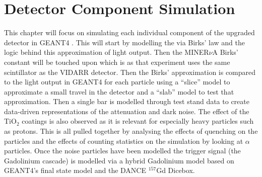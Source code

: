 

\chapter{Detector Component Simulation}\label{chp:GEANT4Simulation}
\ifpdf
    \graphicspath{{Chapter4/Figs/Raster/}{Chapter4/Figs/PDF/}{Chapter4/Figs/}}
\else
    \graphicspath{{Chapter4/Figs/Vector/}{Chapter4/Figs/}}
\fi

This chapter will focus on simulating each individual component of the upgraded detector in GEANT4 \cite{Agostinelli:2002hh}. This will start by modelling the via Birks' law and the logic behind this approximation of light output. Then the MINER$\nu$A Birks' constant will be touched upon which is as that experiment uses the same scintillator as the VIDARR detector. Then the Birks' approximation is compared to the light output in GEANT4 for each particle using a ``slice''  model to approximate a small travel in the detector and a ``slab'' model to test that approximation. Then a single bar is modelled through test stand data to create data-driven representations of the attenuation and dark noise. The effect of the TiO$_2$ coatings is also observed as it is relevant for especially heavy particles such as protons. This is all pulled together by analysing the effects of quenching on the particles and the effects of counting statistics on the simulation by looking at $\alpha$ particles. Once the noise particles have been modelled the trigger signal (the Gadolinium cascade) is modelled via a hybrid Gadolinium model based on GEANT4's final state model and the DANCE $^{157}$Gd Dicebox. 


